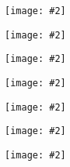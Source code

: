 \documentclass[landscape,a0b,final]{a0poster}
\newenvironment{poster}{
  \begin{center}
  \begin{minipage}[c]{0.98\textwidth}
}{
  \end{minipage} 
  \end{center}
}
\newcommand{\myfig}[3][0]{
\begin{center}
  \vspace{1.5cm}
  \texttt{[image: \#2]}
  \nobreak\medskip
\end{center}}
\begin{document}
\begin{poster}
\begin{multicols}{3}
\begin{multicols}{2}
  \begin{center}
  \myfig{c_spectrum_375_10_20_10_highin.ps}{1.0}
  \end{center}
  \end{multicols}


  \vspace{-3.0cm}
  \setlength{\columnsep}{0pt}
  \setlength{\columnseprule}{0pt}
  \hspace{-2cm}
  \begin{multicols}{2}
  \begin{center}
  \myfig{c_spectrum_375_2_36_2_midin.ps}{1.0}
  \end{center}

  \begin{center}
  \myfig{c_spectrum_375_10_20_10_midin.ps}{1.0}
  \end{center}
  \end{multicols}


  \vspace{-3.0cm}
  \setlength{\columnsep}{0pt}
  \setlength{\columnseprule}{0pt}
  \hspace{-2cm}
  \begin{multicols}{2}
  \begin{center}
  \myfig{c_spectrum_350_2_36_2_highin.ps}{1.0}
  \end{center}

  \begin{center}
  \myfig{c_spectrum_350_10_20_10_highin.ps}{1.0}
  \end{center}

  \end{multicols}


  \vspace{-3.0cm}
  \setlength{\columnsep}{0pt}
  \setlength{\columnseprule}{0pt}
  \hspace{-2cm}
  \begin{multicols}{2}
  \begin{center}
  \myfig{c_spectrum_350_2_36_2_midin.ps}{1.0}
  \end{center}

  \begin{center}
  \myfig{c_spectrum_350_10_20_10_midin.ps}{1.0}
  \end{center}
  \end{multicols}

\nocite{*}


\end{multicols}

\end{poster}
\end{document}
